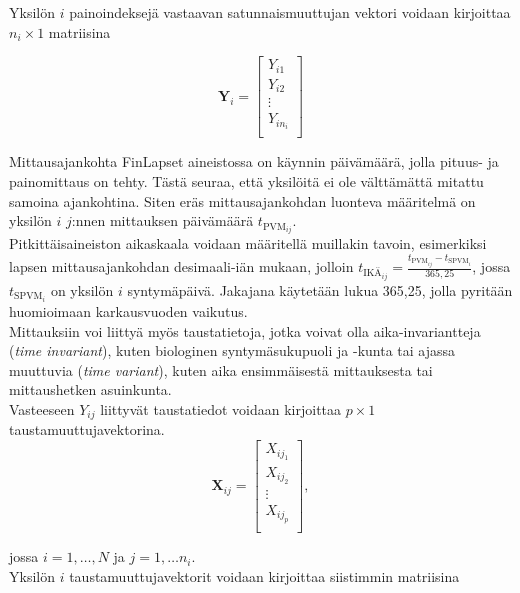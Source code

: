 \documentclass[finnish]{docopts}
\begin{document}
Yksilön $i$ painoindeksejä vastaavan satunnaismuuttujan vektori voidaan kirjoittaa $n_i \times 1$ matriisina

$$
\bm{Y}_i = 
\begin{bmatrix}
Y_{i1} \\
Y_{i2} \\
\vdots \\
Y_{in_i} \\
\end{bmatrix}
$$

Mittausajankohta FinLapset aineistossa on käynnin päivämäärä, jolla pituus- ja painomittaus on tehty. Tästä seuraa, että yksilöitä ei ole välttämättä mitattu samoina ajankohtina. Siten eräs mittausajankohdan luonteva määritelmä on yksilön $i$ $j$:nnen mittauksen päivämäärä $t_{\text{PVM}_{ij}}$.\\

Pitkittäisaineiston aikaskaala voidaan määritellä muillakin tavoin, esimerkiksi lapsen mittausajankohdan desimaali-iän mukaan, jolloin $t_{\text{IKÄ}_{ij}} = \frac{t_{\text{PVM}_{ij}} - t_{\text{SPVM}_{i}}}{365,25}$, jossa $t_{\text{SPVM}_{i}}$ on yksilön $i$ syntymäpäivä. Jakajana käytetään lukua 365,25, jolla pyritään huomioimaan karkausvuoden vaikutus.\\ 

Mittauksiin voi liittyä myös taustatietoja, jotka voivat olla aika-invariantteja (\textit{time invariant}), kuten biologinen syntymäsukupuoli ja -kunta tai ajassa muuttuvia (\textit{time variant}), kuten aika ensimmäisestä mittauksesta tai mittaushetken asuinkunta.\\

Vasteeseen $Y_{ij}$ liittyvät taustatiedot voidaan kirjoittaa $p \times 1$ taustamuuttujavektorina. \\

$$
\bm{X}_{ij} = 
\begin{bmatrix}
X_{ij_{1}} \\
X_{ij_{2}} \\
\vdots \\
X_{ij_{p}} \\
\end{bmatrix},
$$

jossa $i = 1, \dots, N$ ja $j = 1, \dots n_i$. \\ 

Yksilön $i$ taustamuuttujavektorit voidaan kirjoittaa siistimmin matriisina
\end{document}

